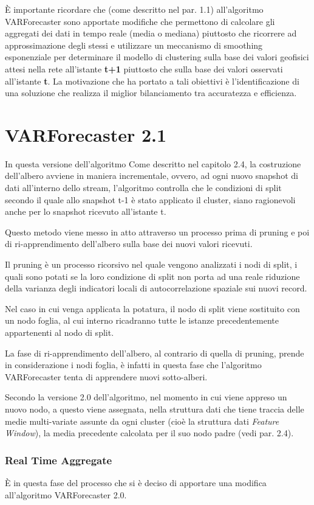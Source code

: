 \documentclass[12pt,a4paper,twoside,openright]{book}
\begin{document}
È importante ricordare che (come descritto nel par. 1.1) all'algoritmo VARForecaster sono apportate modifiche che permettono di calcolare gli aggregati dei dati in tempo reale (media o mediana) piuttosto che ricorrere ad approssimazione degli stessi e utilizzare un meccanismo di smoothing esponenziale per determinare il modello di clustering sulla base dei valori geofisici attesi nella rete all'istante {\bfseries t+1} piuttosto che sulla base dei valori osservati all'istante {\bfseries t}. La motivazione che ha portato a tali obiettivi è l'identificazione di una soluzione che realizza il miglior bilanciamento tra accuratezza e efficienza.
\section{VARForecaster 2.1}
In questa versione dell'algoritmo 
Come descritto nel capitolo 2.4, la costruzione dell'albero avviene in maniera incrementale, ovvero, ad ogni nuovo snapshot di dati all'interno dello stream, l'algoritmo controlla che le condizioni di split secondo il quale allo snapshot t-1 è stato applicato il cluster, siano ragionevoli anche per lo snapshot ricevuto all'istante t.

Questo metodo viene messo in atto attraverso un processo prima di pruning e poi di ri-apprendimento dell'albero sulla base dei nuovi valori ricevuti. 

Il pruning è un processo ricorsivo nel quale vengono analizzati i nodi di split, i quali sono potati se la loro condizione di split non porta ad una reale riduzione della varianza degli indicatori locali di autocorrelazione spaziale sui nuovi record. 

Nel caso in cui venga applicata la potatura, il nodo di split viene sostituito con un nodo foglia, al cui interno ricadranno tutte le istanze precedentemente appartenenti al nodo di split. 

La fase di ri-apprendimento dell'albero, al contrario di quella di pruning, prende in considerazione i nodi foglia, è infatti in questa fase che l'algoritmo VARForecaster tenta di apprendere nuovi sotto-alberi.

Secondo la versione 2.0 dell'algoritmo, nel momento in cui viene appreso un nuovo nodo, a questo viene assegnata, nella struttura dati che tiene traccia delle medie multi-variate assunte da ogni cluster (cioè la struttura dati \textit{Feature Window}), la media precedente calcolata per il suo nodo padre (vedi par. 2.4). 

\subsubsection{Real Time Aggregate}
È in questa fase del processo che si è deciso di apportare una modifica all'algoritmo VARForecaster 2.0. 
\end{document}
